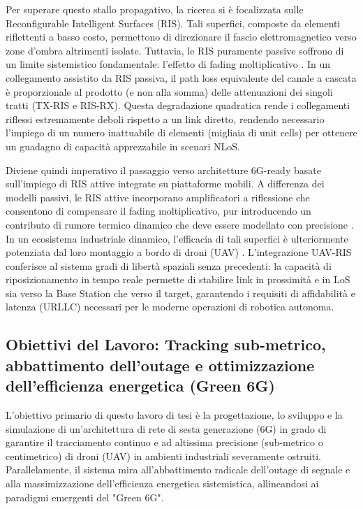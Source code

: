 \documentclass[twoside]{article}
\begin{document}
Per superare questo stallo propagativo, la ricerca si è focalizzata sulle Reconfigurable Intelligent Surfaces (RIS). Tali superfici, composte da elementi riflettenti a basso costo, permettono di direzionare il fascio elettromagnetico verso zone d'ombra altrimenti isolate. Tuttavia, le RIS puramente passive soffrono di un limite sistemistico fondamentale: l'effetto di fading moltiplicativo \cite{Zhang2022}. In un collegamento assistito da RIS passiva, il path loss equivalente del canale a cascata è proporzionale al prodotto (e non alla somma) delle attenuazioni dei singoli tratti (TX-RIS e RIS-RX). Questa degradazione quadratica rende i collegamenti riflessi estremamente deboli rispetto a un link diretto, rendendo necessario l'impiego di un numero inattuabile di elementi (migliaia di unit cells) per ottenere un guadagno di capacità apprezzabile in scenari NLoS.

Diviene quindi imperativo il passaggio verso architetture 6G-ready basate sull'impiego di RIS attive integrate su piattaforme mobili. A differenza dei modelli passivi, le RIS attive incorporano amplificatori a riflessione che consentono di compensare il fading moltiplicativo, pur introducendo un contributo di rumore termico dinamico che deve essere modellato con precisione \cite{Zhang2022,Wei2024}. In un ecosistema industriale dinamico, l'efficacia di tali superfici è ulteriormente potenziata dal loro montaggio a bordo di droni (UAV) \cite{Muller2024,Azizi2024}. L'integrazione UAV-RIS conferisce al sistema gradi di libertà spaziali senza precedenti: la capacità di riposizionamento in tempo reale permette di stabilire link in prossimità e in LoS sia verso la Base Station che verso il target, garantendo i requisiti di affidabilità e latenza (URLLC) necessari per le moderne operazioni di robotica autonoma.

\subsection{Obiettivi del Lavoro: Tracking sub-metrico, abbattimento dell'outage e ottimizzazione dell'efficienza energetica (Green 6G)}



L'obiettivo primario di questo lavoro di tesi è la progettazione, lo sviluppo e la simulazione di un'architettura di rete di sesta generazione (6G) in grado di garantire il tracciamento continuo e ad altissima precisione (sub-metrico o centimetrico) di droni (UAV) in ambienti industriali severamente ostruiti. Parallelamente, il sistema mira all'abbattimento radicale dell'outage di segnale e alla massimizzazione dell'efficienza energetica sistemistica, allineandosi ai paradigmi emergenti del "Green 6G".
\end{document}
